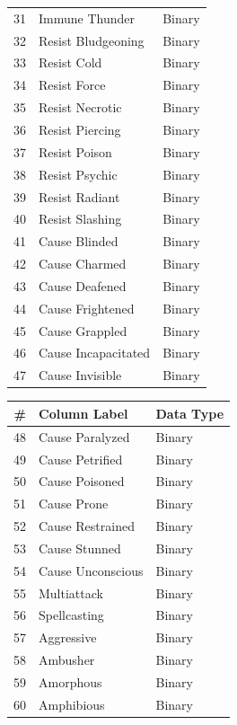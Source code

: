 \documentclass{article}
\begin{document}
\begin{table}[!htbp]
\begin{scriptsize}
\begin{minipage}[b]{0.45\linewidth}
\begin{longtable}[]{@{}rll@{}}
	31 & Immune Thunder & Binary \\
	32 & Resist Bludgeoning & Binary \\
	33 & Resist Cold & Binary \\
	34 & Resist Force & Binary \\
	35 & Resist Necrotic & Binary \\
	36 & Resist Piercing & Binary \\
	37 & Resist Poison & Binary \\
	38 & Resist Psychic & Binary \\
	39 & Resist Radiant & Binary \\
	40 & Resist Slashing & Binary \\
	41 & Cause Blinded & Binary \\
	42 & Cause Charmed & Binary \\
	43 & Cause Deafened & Binary \\
	44 & Cause Frightened & Binary \\
	45 & Cause Grappled & Binary \\
	46 & Cause Incapacitated & Binary \\
	47 & Cause Invisible & Binary \\
	\bottomrule
\end{longtable}
\end{minipage}
\hspace{0.5cm}
\begin{minipage}[b]{0.45\linewidth}\centering
\begin{longtable}{@{}rll@{}}
	\toprule
	\# & Column Label & Data Type \\
	\midrule
	\endhead
	48 & Cause Paralyzed & Binary \\
	49 & Cause Petrified & Binary \\
	50 & Cause Poisoned & Binary \\
	51 & Cause Prone & Binary \\
	52 & Cause Restrained & Binary \\
	53 & Cause Stunned & Binary \\
	54 & Cause Unconscious & Binary \\
	55 & Multiattack & Binary \\
	56 & Spellcasting & Binary \\
	57 & Aggressive & Binary \\
	58 & Ambusher & Binary \\
	59 & Amorphous & Binary \\
	60 & Amphibious & Binary \\

\end{longtable}
\end{minipage}
\end{scriptsize}
\end{table}
\end{document}

